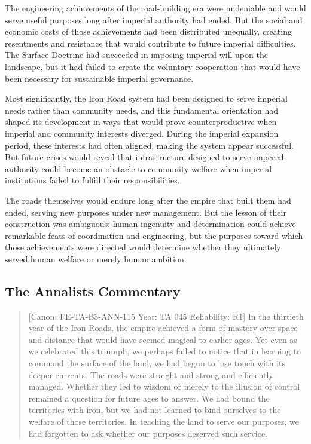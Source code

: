 The engineering achievements of the road-building era were undeniable
and would serve useful purposes long after imperial authority had ended.
But the social and economic costs of those achievements had been
distributed unequally, creating resentments and resistance that would
contribute to future imperial difficulties. The Surface Doctrine had
succeeded in imposing imperial will upon the landscape, but it had
failed to create the voluntary cooperation that would have been
necessary for sustainable imperial governance.

Most significantly, the Iron Road system had been designed to serve
imperial needs rather than community needs, and this fundamental
orientation had shaped its development in ways that would prove
counterproductive when imperial and community interests diverged. During
the imperial expansion period, these interests had often aligned, making
the system appear successful. But future crises would reveal that
infrastructure designed to serve imperial authority could become an
obstacle to community welfare when imperial institutions failed to
fulfill their responsibilities.

The roads themselves would endure long after the empire that built them
had ended, serving new purposes under new management. But the lesson of
their construction was ambiguous: human ingenuity and determination
could achieve remarkable feats of coordination and engineering, but the
purposes toward which those achievements were directed would determine
whether they ultimately served human welfare or merely human ambition.

\subsection{The Annalist\textquotesingle s
Commentary}\label{the-annalists-commentary}

\begin{quote}
{[}Canon: FE-TA-B3-ANN-115 \textbar{} Year: TA 045 \textbar{}
Reliability: R1{]} In the thirtieth year of the Iron Roads, the empire
achieved a form of mastery over space and distance that would have
seemed magical to earlier ages. Yet even as we celebrated this triumph,
we perhaps failed to notice that in learning to command the surface of
the land, we had begun to lose touch with its deeper currents. The roads
were straight and strong and efficiently managed. Whether they led to
wisdom or merely to the illusion of control remained a question for
future ages to answer. We had bound the territories with iron, but we
had not learned to bind ourselves to the welfare of those territories.
In teaching the land to serve our purposes, we had forgotten to ask
whether our purposes deserved such service.
\end{quote}

